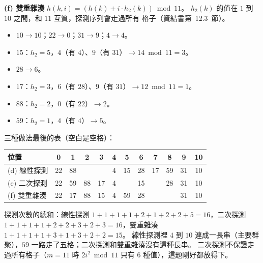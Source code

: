 \begin{pastsoln}
\textbf{(f) 雙重雜湊} $h(k, i) = (h(k) + i \cdot h_2(k)) \bmod 11$。 $h_2(k)$ 的值在 $1$ 到 $10$ 之間，和 $11$ 互質，探測序列會走過所有
格子（資結書第~12.3~節）。
\begin{itemize}
\item $10 \to 10$；$22 \to 0$；$31 \to 9$；$4 \to 4$。
\item $15$：$h_2 = 5$，$4$（有 $4$）、$9$（有 $31$）$\to 14 \bmod 11 = 3$。
\item $28 \to 6$。
\item $17$：$h_2 = 3$，$6$（有 $28$）、$9$（有 $31$）$\to 12 \bmod 11 = 1$。
\item $88$：$h_2 = 2$，$0$（有 $22$）$\to 2$。
\item $59$：$h_2 = 1$，$4$（有 $4$）$\to 5$。
\end{itemize}

三種做法最後的表（空白是空格）：
\begin{center}
\small
\begin{tabular}{l*{11}{c}}
\toprule
位置 & 0 & 1 & 2 & 3 & 4 & 5 & 6 & 7 & 8 & 9 & 10 \\
\midrule
(d) 線性探測 & 22 & 88 & & & 4 & 15 & 28 & 17 & 59 & 31 & 10 \\
(e) 二次探測 & 22 & 59 & 88 & 17 & 4 & & 15 & & 28 & 31 & 10 \\
(f) 雙重雜湊 & 22 & 17 & 88 & 15 & 4 & 59 & 28 & & & 31 & 10 \\
\bottomrule
\end{tabular}
\end{center}
探測次數的總和：線性探測 $1+1+1+1+2+1+2+2+5 = 16$，二次探測 $1+1+1+1+2+2+3+2+3 = 16$，雙重雜湊
$1+1+1+1+3+1+3+2+2 = 15$。 線性探測裡 $4$ 到 $10$ 連成一長串（主要群聚），$59$ 一路走了五格；二次探測和雙重雜湊沒有這種長串。
二次探測不保證走過所有格子（$m = 11$ 時 $2i^2 \bmod 11$ 只有 $6$ 種值），這題剛好都放得下。
\end{pastsoln}
